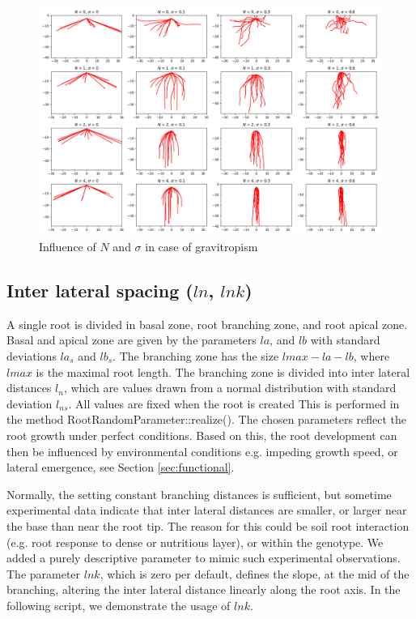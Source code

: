 \begin{figure}
\centering
\includegraphics[width=\textwidth]{fig_gravitropism.png}
\caption{Influence of $N$ and $\sigma$ in case of gravitropism} \label{fig:tropism}
\end{figure}




\subsection{Inter lateral spacing ($ln$, $lnk$)} \label{ssec:spacing}

A single root is divided in basal zone, root branching zone, and root apical zone. Basal and apical zone are given by the parameters $la$, and $lb$ with standard deviations $la_s$ and $lb_s$. The branching zone has the size $lmax-la-lb$, where $lmax$ is the maximal root length. The branching zone is divided into inter lateral distances $l_n$, which are values drawn from a normal distribution with standard deviation $l_{ns}$. All values are fixed when the root is created This is performed in the method RootRandomParameter::realize(). The chosen parameters reflect the root growth under perfect conditions. Based on this, the root development can then be influenced by environmental conditions e.g. impeding growth speed, or lateral emergence, see Section \ref{sec:functional}.

Normally, the setting constant branching distances is sufficient, but sometime experimental data indicate that inter lateral distances are smaller, or larger near the base than near the root tip. The reason for this could be soil root interaction (e.g. root response to dense or nutritious layer), or within the genotype. We added a purely descriptive parameter to mimic such experimental observations. The parameter $lnk$, which is zero per default, defines the slope, at the mid of the branching, altering the inter lateral distance linearly along the root axis. In the following script, we demonstrate the usage of $lnk$.

